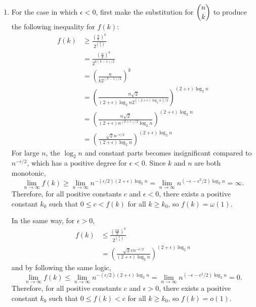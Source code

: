 \documentclass[a4paper,12pt]{article}
\begin{document}
\begin{enumerate}
\item For the case in which $\epsilon < 0$, first make the substitution for $\dbinom{n}{k}$ to produce the following inequality for $f(k)$:
\begin{align*}
f(k) &\geq \frac{\left(\frac{n}{k}\right)^k}{2^{\binom{k}{2}}} \\
&= \frac{\left(\frac{n}{k}\right)^k}{2^{k(k-1)/2}} \\
&= \left(\frac{n}{k2^{(k-1)/2}}\right)^k \\
&= \left(\frac{n\sqrt{2}}{(2+\epsilon)\log_2n2^{((2+\epsilon)\log_2n)/2}}\right)^{(2+\epsilon)\log_2n} \\
&= \left(\frac{n\sqrt{2}}{(2+\epsilon)n^{(2+\epsilon)/2}\log_2n}\right)^{(2+\epsilon)\log_2n} \\
&= \left(\frac{\sqrt{2}n^{-\epsilon/2}}{(2+\epsilon)\log_2n}\right)^{(2+\epsilon)\log_2n}
\end{align*}
For large $n$, the $\log_2n$ and constant parts becomes insignificant compared to $n^{-\epsilon/2}$, which has a positive degree for $\epsilon < 0$. Since $k$ and $n$ are both monotonic,
\[ \lim_{n \to \infty}f(k) \geq \lim_{n \to \infty}n^{-(\epsilon/2)(2+\epsilon)\log_2n} = \lim_{n \to \infty}n^{(-\epsilon-\epsilon^2/2)\log_2n} = \infty. \]
Therefore, for all positive constants $c$ and $\epsilon < 0$, there exists a positive constant $k_0$ such that $0 \leq c < f(k)$ for all $k \geq k_0$, so $f(k) = \omega(1)$. \par
In the same way, for $\epsilon > 0$,
\begin{align*}
f(k) &\leq \frac{\left(\frac{en}{k}\right)^k}{2^{\binom{k}{2}}} \\
&= \left(\frac{\sqrt{2}en^{-\epsilon/2}}{(2+\epsilon)\log_2n}\right)^{(2+\epsilon)\log_2n}
\end{align*}
and by following the same logic,
\[ \lim_{n \to \infty}f(k) \leq \lim_{n \to \infty}n^{-(\epsilon/2)(2+\epsilon)\log_2n} = \lim_{n \to \infty}n^{(-\epsilon-\epsilon^2/2)\log_2n} = 0. \]
Therefore, for all positive constants $c$ and $\epsilon > 0$, there exists a positive constant $k_0$ such that $0 \leq f(k) < c$ for all $k \geq k_0$, so $f(k) = o(1)$.

\end{enumerate}
\end{document}
